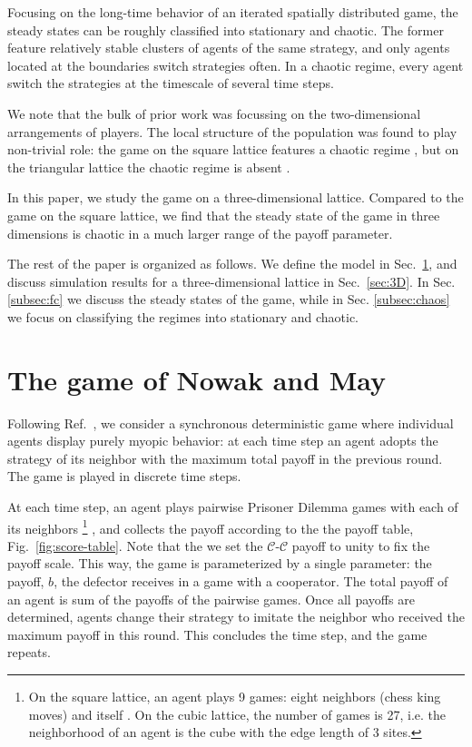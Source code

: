 \documentclass[a4paper]{jpconf}
\begin{document}
Focusing on the long-time behavior of an iterated spatially
distributed game, the steady states can be roughly classified into stationary
and chaotic. The former feature relatively stable clusters of agents of the same
strategy, and only agents located at the boundaries switch strategies often. 
In a chaotic regime, every agent switch the strategies at
the timescale of several time steps.

We note that the bulk of prior work was focussing on the two-dimensional arrangements of
players. The local structure of the population was found to play non-trivial
role: the game on the square lattice features a chaotic regime \cite{Nowak1992}, 
but on the triangular lattice the chaotic regime is absent \cite{Burovski2019}.

In this paper, we study the game on a three-dimensional lattice. Compared to 
the game on the square lattice, we find that
the steady state of the game in three dimensions is chaotic in a much larger 
range of the payoff parameter.

The rest of the paper is organized as follows. We define the model in
Sec.\ \ref{sec:model}, and discuss simulation results for a three-dimensional
lattice in Sec.\ \ref{sec:3D}. In Sec. \ref{subsec:fc} we discuss the steady
states of the game, while in Sec. \ref{subsec:chaos} we focus on classifying the
regimes into stationary and chaotic.


\section{The game of Nowak and May}
\label{sec:model}

Following Ref.\ \cite{Nowak1992}, we consider a synchronous deterministic game
where individual agents display purely myopic behavior: at each time step
an agent adopts the strategy of its neighbor with the maximum total payoff
in the previous round. The game is played in discrete time steps. 

At each time step, an agent plays pairwise Prisoner Dilemma games with 
each of its neighbors%
%
\footnote{On the square lattice, an agent plays 9 games: eight neighbors (chess king moves)
and itself \cite{Nowak1993}. On the cubic lattice, the number of games is 27, i.e.
the neighborhood of an agent is the cube with the edge length of 3 sites.}
%
%
, and collects the payoff according to the the payoff
table, Fig.\ \ref{fig:score-table}.  Note that the we set the
$\mathcal{C}$-$\mathcal{C}$ payoff to unity to fix the payoff scale. This way, the
game is parameterized by a single parameter: the payoff, $b$, the defector receives
in a game with a cooperator. 
The total payoff of an agent is sum of the payoffs of the pairwise games. Once all 
payoffs are determined, agents change their strategy to imitate the neighbor
who received the maximum payoff in this round. This concludes the time step,
and the game repeats.
\end{document}
